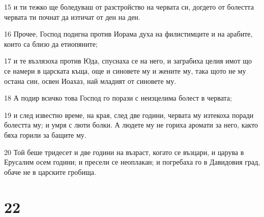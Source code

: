 \par 15 и ти тежко ще боледуваш от разстройство на червата си, догдето от болестта червата ти почнат да изтичат от ден на ден.
\par 16 Прочее, Господ подигна против Иорама духа на филистимците и на арабите, които са близо да етиопяните;
\par 17 и те възлязоха против Юда, спуснаха се на него, и заграбиха целия имот що се намери в царската къща, още и синовете му и жените му, така щото не му остана син, освен Иоахаз, най младият от синовете му.
\par 18 А подир всичко това Господ го порази с неизцелима болест в червата;
\par 19 и след известно време, на края, след две години, червата му изтекоха поради болестта му; и умря с люти болки. А людете му не гориха аромати за него, както бяха горили за бащите му.
\par 20 Той беше тридесет и две години на възраст, когато се възцари, и царува в Ерусалим осем години; и пресели се неоплакан; и погребаха го в Давидовия град, обаче не в царските гробища.

\chapter{22}

